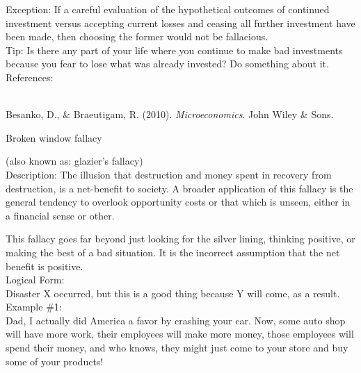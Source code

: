 \documentclass[a4paper,12pt,single,pdftex]{scrbook}
\begin{document}
    
      Exception: If a careful evaluation of the hypothetical outcomes of continued investment versus accepting current losses and ceasing all further investment have been made, then choosing the former would not be fallacious.
    \\

    
      Tip: Is there any part of your life where you continue to make bad investments because you fear to lose what was already invested? Do something about it.
    \\

    References:

    
      
        
      \\

      
        
          Besanko, D., \& Braeutigam, R. (2010). {\it Microeconomics}. John Wiley \& Sons.
        
      
    
  

Broken window fallacy
    
      (also known as: glazier's fallacy)
    \\

  
    Description: The illusion that destruction and money spent in recovery from destruction, is a net-benefit to society.  A broader application of this fallacy is the general tendency to overlook opportunity costs or that which is unseen, either in a financial sense or other.

    
      This fallacy goes far beyond just looking for the silver lining, thinking positive, or making the best of a bad situation.  It is the incorrect assumption that the net benefit is positive.
    \\

    
      Logical Form:
    \\

    
      Disaster X occurred, but this is a good thing because Y will come, as a result.
    \\

    
      Example \#1:
    \\

    
      Dad, I actually did America a favor by crashing your car.  Now, some auto shop will have more work, their employees will make more money, those employees will spend their money, and who knows, they might just come to your store and buy some of your products!
    \\
\end{document}
